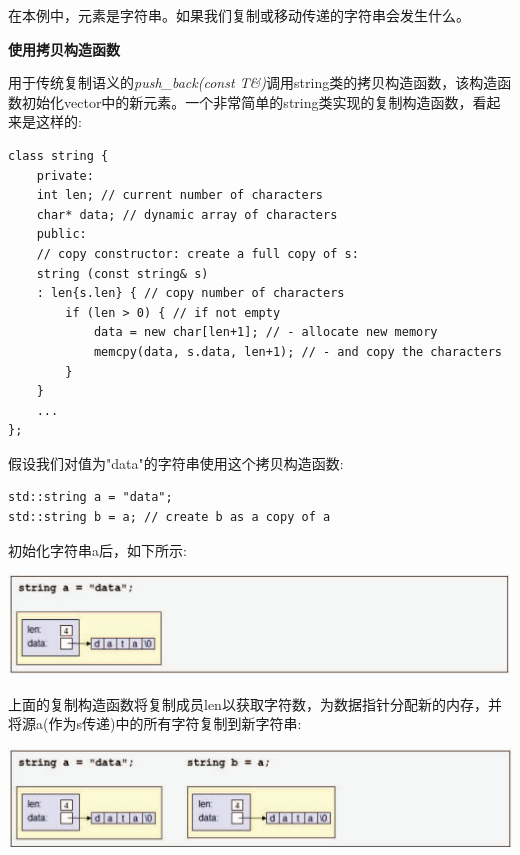 在本例中，元素是字符串。如果我们复制或移动传递的字符串会发生什么。\par

\hspace*{\fill} \par %
\textbf{使用拷贝构造函数}

用于传统复制语义的\textit{push\_back(const T\&)}调用string类的拷贝构造函数，该构造函数初始化vector中的新元素。一个非常简单的string类实现的复制构造函数，看起来是这样的:\par

\begin{lstlisting}[caption={}]
class string {
	private:
	int len; // current number of characters
	char* data; // dynamic array of characters
	public:
	// copy constructor: create a full copy of s:
	string (const string& s)
	: len{s.len} { // copy number of characters
		if (len > 0) { // if not empty
			data = new char[len+1]; // - allocate new memory
			memcpy(data, s.data, len+1); // - and copy the characters
		}
	}
	...
};
\end{lstlisting}

假设我们对值为"data"的字符串使用这个拷贝构造函数:\par

\begin{lstlisting}[caption={}]
std::string a = "data";
std::string b = a; // create b as a copy of a
\end{lstlisting}

初始化字符串a后，如下所示:\par

\begin{center}
	\includegraphics[width=1.0\textwidth]{content/1/chapter1/images/18}
\end{center}

上面的复制构造函数将复制成员len以获取字符数，为数据指针分配新的内存，并将源a(作为s传递)中的所有字符复制到新字符串:\par

\begin{center}
	\includegraphics[width=1.0\textwidth]{content/1/chapter1/images/19}
\end{center}

